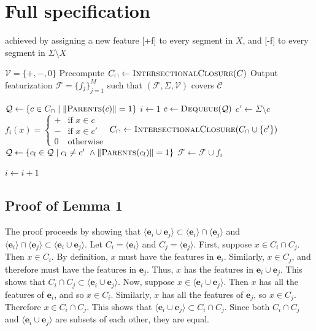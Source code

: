 \documentclass[11pt, oneside]{article}   	%
\begin{document}
\section{Full specification}
achieved by assigning a new feature [+f] to every segment in $X$, and [-f] to every segment in $\Sigma \setminus X$

\vspace{\baselineskip} \noindent \begin{algorithmic}
	\REQUIRE $\mathcal V = \{ +, -, 0 \}$
	\REQUIRE Precompute $C_\cap \leftarrow \textsc{IntersectionalClosure}(C)$
	\ENSURE Output featurization $\mathcal F = \{ f_j \}_{j=1}^M$ such that $(\mathcal F, \Sigma, \mathcal V)$ covers $\mathcal C$
	
	\STATE
	\STATE $\mathcal Q \leftarrow \{c \in C_\cap \mid \Vert\textsc{Parents}(c)\Vert = 1 \}$
	\STATE $i \leftarrow 1$
	\STATE
	\STATE $c \leftarrow \textsc{Dequeue}(\mathcal Q)$
	\STATE $c' \leftarrow \Sigma \setminus c$
	\STATE $f_i(x) = \begin{cases}
	+ & \mbox{if } x \in c \\
	- & \mbox{if } x \in c' \\
	0 & \mbox{otherwise}
	\end{cases} $
	\STATE $C_\cap \leftarrow \textsc{IntersectionalClosure}(C_\cap \cup \{c'\})$
	\STATE $\mathcal Q \leftarrow \{c_l \in \mathcal Q \mid c_l \not= c' \ \land \Vert \textsc{Parents}(c_l) \Vert = 1 \}$
	\STATE $\mathcal F \leftarrow \mathcal F \cup f_i$
	
	\STATE $i \leftarrow i + 1$
	\ENDWHILE
\end{algorithmic}

\appendix

\subsection{Proof of Lemma 1}

The proof proceeds by showing that $\langle \mathbf{e}_i \cup \mathbf{e}_j \rangle \subset  \langle \mathbf{e}_i \rangle \cap \langle \mathbf{e}_j \rangle$ and $ \langle \mathbf{e}_i \rangle \cap \langle \mathbf{e}_j \rangle \subset \langle \mathbf{e}_i \cup \mathbf{e}_j \rangle$.
Let $C_i = \langle \mathbf{e}_i \rangle$ and $C_j = \langle \mathbf{e}_j \rangle$.
First, suppose $x \in C_i \cap C_j$. Then $x \in C_i$. By definition, $x$ must have the features in $\mathbf{e}_i$.
Similarly, $x \in C_j$, and therefore must have the features in $\mathbf{e}_j$.
Thus, $x$ has the features in $\mathbf{e}_i \cup \mathbf{e}_j$. This shows that $C_i \cap C_j \subset \langle \mathbf{e}_i \cup \mathbf{e}_j \rangle$.
Now, suppose $x \in \langle \mathbf{e}_i \cup \mathbf{e}_j \rangle$. Then $x$ has all the features of $\mathbf{e}_i$, and so $x \in C_i$.
Similarly, $x$ has all the features of $\mathbf{e}_j$, so $x \in C_j$. Therefore $x \in C_i \cap C_j$. This shows that $\langle \mathbf{e}_i \cup \mathbf{e}_j \rangle \subset C_i \cap C_j$.
Since both $C_i \cap C_j$ and $\langle \mathbf{e}_i \cup \mathbf{e}_j \rangle$ are subsets of each other, they are equal.
\end{document}
